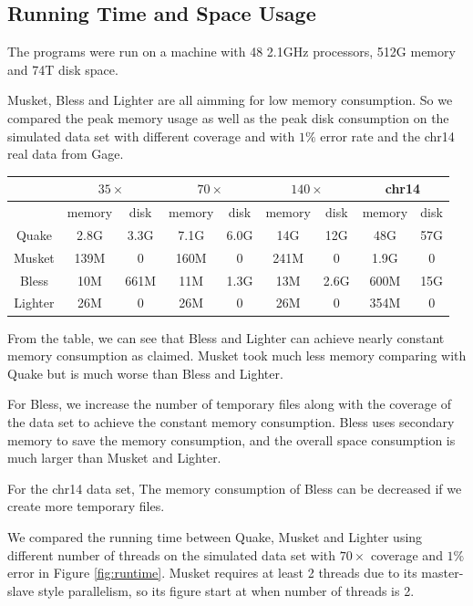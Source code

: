 \documentclass[10pt]{article}
\begin{document}
\subsection*{Running Time and Space Usage}
The programs were run on a machine with 48 2.1GHz processors, 512G memory and 74T disk space. 

Musket, Bless and Lighter are all aimming for low memory consumption. So we compared the peak memory usage as well as the peak disk consumption on the simulated data set with different coverage and with $1\%$ error rate and the chr14 real data from Gage.

\begin{tabular}{|c|c|c||c|c||c|c||c|c|} \hline
		& \multicolumn{2}{|c||}{$35\times$} & \multicolumn{2}{|c||}{$70\times$}  & \multicolumn{2}{|c||}{$140\times$} & \multicolumn{2}{|c|}{chr14}  \\ \hline
		& memory & disk & memory & disk & memory & disk & memory & disk \\ \hline
Quake   & 2.8G	& 3.3G & 7.1G & 6.0G & 14G & 12G & 48G & 57G \\ \hline		
Musket	& 139M	& 0 & 160M & 0 & 241M & 0 & 1.9G & 0 \\ \hline
Bless	& 10M	& 661M & 11M & 1.3G & 13M & 2.6G & 600M & 15G \\ \hline
Lighter	& 26M	& 0 & 26M & 0 & 26M & 0 & 354M & 0 \\ \hline
\end{tabular}

From the table, we can see that Bless and Lighter can achieve nearly constant memory consumption as claimed. Musket took much less memory comparing with Quake but is much worse than Bless and Lighter.

For Bless, we increase the number of temporary files along with the coverage of the data set to achieve the constant memory consumption. Bless uses secondary memory to save the memory consumption, and the overall space consumption is much larger than Musket and Lighter. 

For the chr14 data set, The memory consumption of Bless can be decreased if we create more temporary files. 

We compared the running time between Quake, Musket and Lighter using different number of threads on the simulated data set with $70\times$ coverage and $1\%$ error in Figure \ref{fig:runtime}. Musket requires at least 2 threads due to its master-slave style parallelism, so its figure start at when number of threads is 2. 
\end{document}
